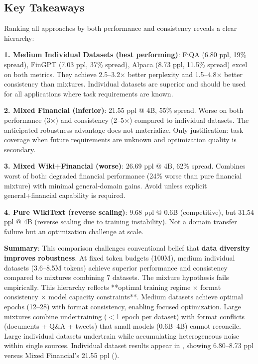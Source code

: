 

\subsection{Key Takeaways}

Ranking all approaches by both performance and consistency reveals a clear hierarchy:

\textbf{1. Medium Individual Datasets (best performing)}: FiQA (6.80 ppl, 19\% spread), FinGPT (7.03 ppl, 37\% spread), Alpaca (8.73 ppl, 11.5\% spread) excel on both metrics. They achieve 2.5–3.2$\times$ better perplexity and 1.5–4.8$\times$ better consistency than mixtures. Individual datasets are superior and should be used for all applications where task requirements are known.

\textbf{2. Mixed Financial (inferior)}: 21.55 ppl @ 4B, 55\% spread. Worse on both performance (3$\times$) and consistency (2–5$\times$) compared to individual datasets. The anticipated robustness advantage does not materialize. Only justification: task coverage when future requirements are unknown and optimization quality is secondary.

\textbf{3. Mixed Wiki+Financial (worse)}: 26.69 ppl @ 4B, 62\% spread. Combines worst of both: degraded financial performance (24\% worse than pure financial mixture) with minimal general-domain gains. Avoid unless explicit general+financial capability is required.

\textbf{4. Pure WikiText (reverse scaling)}: 9.68 ppl @ 0.6B (competitive), but 31.54 ppl @ 4B (reverse scaling due to training instability). Not a domain transfer failure but an optimization challenge at scale.

\textbf{Summary}: This comparison challenges conventional belief that \textbf{data diversity improves robustness}. At fixed token budgets (100M), medium individual datasets (3.6–8.5M tokens) achieve superior performance and consistency compared to mixtures combining 7 datasets. The mixture hypothesis fails empirically. This hierarchy reflects **optimal training regime × format consistency × model capacity constraints**. Medium datasets achieve optimal epochs (12–28) with format consistency, enabling focused optimization. Large mixtures combine undertraining ($<$1 epoch per dataset) with format conflicts (documents + Q\&A + tweets) that small models (0.6B–4B) cannot reconcile. Large individual datasets undertrain while accumulating heterogeneous noise within single sources. Individual dataset results appear in , showing 6.80–8.73 ppl versus Mixed Financial's 21.55 ppl ().

